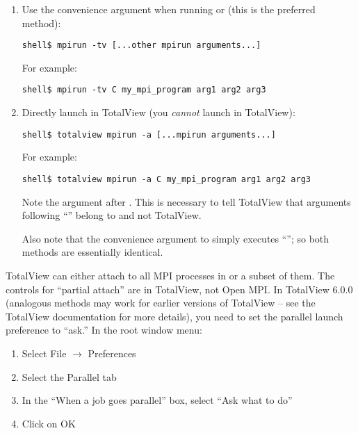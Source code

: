 \begin{enumerate}
\item Use the  convenience argument when running
   or  (this is the preferred method):

  \lstset{style=lam-cmdline}
  \begin{lstlisting}
shell$ mpirun -tv [...other mpirun arguments...]
  \end{lstlisting}

  For example:
  
  \lstset{style=lam-cmdline}
  \begin{lstlisting}
shell$ mpirun -tv C my_mpi_program arg1 arg2 arg3
  \end{lstlisting}

\item Directly launch  in TotalView (you {\em cannot}
  launch  in TotalView):
  
  \lstset{style=lam-cmdline}
  \begin{lstlisting}
shell$ totalview mpirun -a [...mpirun arguments...]
  \end{lstlisting}
  
  For example:
  
  \lstset{style=lam-cmdline}
  \begin{lstlisting}
shell$ totalview mpirun -a C my_mpi_program arg1 arg2 arg3
  \end{lstlisting}
  
  Note the  argument after .  This is necessary
  to tell TotalView that arguments following ``'' belong to
   and not TotalView.
  
  Also note that the  convenience argument to 
  simply executes ``''; so both methods
  are essentially identical.
\end{enumerate}
        
TotalView can either attach to all MPI processes in
 or a subset of them.  The controls for
``partial attach'' are in TotalView, not Open MPI.  In TotalView 6.0.0
(analogous methods may work for earlier versions of TotalView -- see
the TotalView documentation for more details), you need to set the
parallel launch preference to ``ask.''  In the root window menu:

\begin{enumerate}
\item Select File $\rightarrow$ Preferences
\item Select the Parallel tab
\item In the ``When a job goes parallel'' box, select ``Ask what to do''
\item Click on OK
\end{enumerate}

